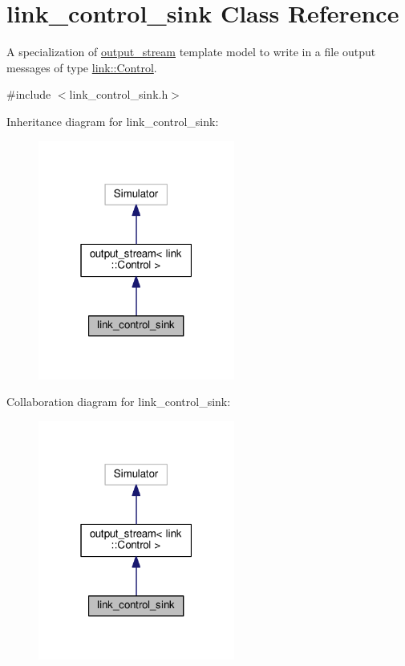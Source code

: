\hypertarget{classlink__control__sink}{}\section{link\+\_\+control\+\_\+sink Class Reference}
\label{classlink__control__sink}


A specialization of \hyperlink{classoutput__stream}{output\+\_\+stream} template model to write in a file output messages of type \hyperlink{structlink_1_1Control}{link\+::\+Control}.  




{\ttfamily \#include $<$link\+\_\+control\+\_\+sink.\+h$>$}



Inheritance diagram for link\+\_\+control\+\_\+sink\+:\nopagebreak
\begin{figure}[H]
\begin{center}
\leavevmode
\includegraphics[width=183pt]{classlink__control__sink__inherit__graph}
\end{center}
\end{figure}


Collaboration diagram for link\+\_\+control\+\_\+sink\+:\nopagebreak
\begin{figure}[H]
\begin{center}
\leavevmode
\includegraphics[width=183pt]{classlink__control__sink__coll__graph}
\end{center}
\end{figure}
